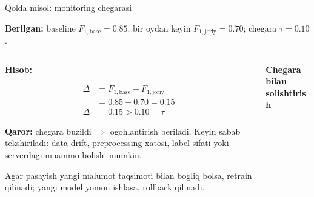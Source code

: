 \documentclass[aspectratio=169,11pt]{beamer}
\newcommand{\uzq}{\textquotesingle{}}   %
\begin{document}
\begin{frame}{Qo\uzq{}lda misol: monitoring chegarasi}
  \small

  \begin{tcolorbox}[defbox,top=2pt,bottom=2pt,left=4pt,right=4pt]
    \footnotesize
    \textbf{Berilgan:}
    baseline $F_{1,\text{base}} = 0.85$;
    bir oydan keyin $F_{1,\text{joriy}} = 0.70$;
    chegara $\tau = 0.10$.
  \end{tcolorbox}

  \vspace{2pt}

  \begin{columns}[T,totalwidth=\textwidth]
    \begin{column}{0.50\textwidth}
      \textbf{Hisob:}

      \begin{align*}
        \Delta &= F_{1,\text{base}} - F_{1,\text{joriy}}\\
               &= 0.85 - 0.70 = 0.15\\
        \Delta &= 0.15 > 0.10 = \tau
      \end{align*}

      \begin{tcolorbox}[warnbox,top=2pt,bottom=2pt,left=4pt,right=4pt]
        \footnotesize
        \textbf{Qaror:} chegara buzildi $\Rightarrow$ ogohlantirish beriladi.
        Keyin sabab tekshiriladi: data drift, preprocessing xatosi,
        label sifati yoki serverdagi muammo bo\uzq{}lishi mumkin.
      \end{tcolorbox}

      \vspace{2pt}
      {\scriptsize
      Agar pasayish yangi ma\uzq{}lumot taqsimoti bilan bog\uzq{}liq bo\uzq{}lsa,
      retrain qilinadi; yangi model yomon ishlasa, rollback qilinadi.
      }
    \end{column}

    \begin{column}{0.47\textwidth}
      \centering
      {\footnotesize\textbf{Chegara bilan solishtirish}}\\[2pt]

\end{column}
\end{columns}
\end{frame}
\end{document}
